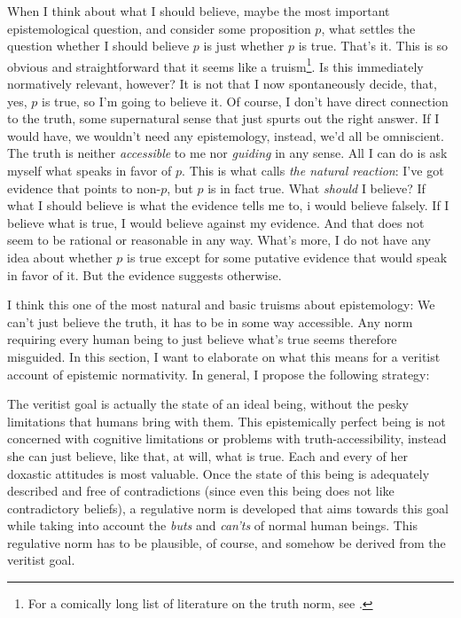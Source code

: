 \documentclass[12pt,numbers=noenddot]{scrartcl}
\begin{document}
When I think about what I should believe, maybe the most important epistemological question, and consider some proposition $p$, what settles the question whether I should believe $p$ is just whether $p$ is true. That's it. This is so obvious and straightforward that it seems like a truism\footnote{For a comically long list of literature on the truth norm, see \textcite[25]{Mchugh2012-MCHTTN}.}. Is this immediately normatively relevant, however? It is not that I now spontaneously decide, that, yes, $p$ is true, so I'm going to believe it. Of course, I don't have direct connection to the truth, some supernatural sense that just spurts out the right answer. If I would have, we wouldn't need any epistemology, instead, we'd all be omniscient. The truth is neither \emph{accessible} to me nor \emph{guiding} in any sense. All I can do is ask myself what speaks in favor of $p$. This is what \textcite{Gibbons2013-GIBTNO} calls \emph{the natural reaction}: I've got evidence that points to non-$p$, but $p$ is in fact true. What \emph{should} I believe? If what I should believe is what the evidence tells me to, i would believe falsely. If I believe what is true, I would believe against my evidence. And that does not seem to be rational or reasonable in any way. What's more, I do not have any idea about whether $p$ is true except for some putative evidence that would speak in favor of it. But the evidence suggests otherwise.

I think this one of the most natural and basic truisms about epistemology: We can't just believe the truth, it has to be in some way accessible. Any norm requiring every human being to just believe what's true seems therefore misguided. In this section, I want to elaborate on what this means for a veritist account of epistemic normativity. In general, I propose the following strategy:

The veritist goal is actually the state of an ideal being, without the pesky limitations that humans bring with them. This epistemically perfect being is not concerned with cognitive limitations or problems with truth-accessibility, instead she can just believe, like that, at will, what is true. Each and every of her doxastic attitudes is most valuable. Once the state of this being is adequately described and free of contradictions (since even this being does not like contradictory beliefs), a regulative norm is developed that aims towards this goal while taking into account the \emph{buts} and \emph{can'ts} of normal human beings. This regulative norm has to be plausible, of course, and somehow be derived from the veritist goal.
\end{document}
